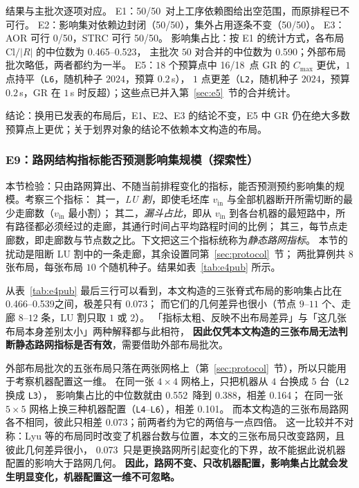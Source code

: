 \documentclass[manuscript,screen,review]{acmart}
\providecommand{\STRC}{\textsc{STRC}}
\newcommand{\NSeeds}{10}
\newcommand{\NPairs}{50}
\newcommand{\EoneFracMed}{0.590}    %
\newcommand{\NPubPairs}{50}
\newcommand{\PubPassMiss}{\NPubPairs/\NPubPairs}
\newcommand{\PubFeasRone}{0/\NPubPairs}
\newcommand{\PubFeasRtwo}{\NPubPairs/\NPubPairs}
\newcommand{\PubPassClosed}{\NPubPairs/\NPubPairs}
\newcommand{\PubPassInvar}{\NPubPairs/\NPubPairs}
\newcommand{\PubEoneFracLo}{0.465}
\newcommand{\PubEoneFracHi}{0.523}
\newcommand{\PubCloLo}{0.388}
\newcommand{\PubCloHi}{0.552}
\newcommand{\PubCloSpread}{0.164}
\newcommand{\PubCloSpreadBig}{0.101}
\newcommand{\SelfCloLo}{0.466}
\newcommand{\SelfCloHi}{0.539}
\newcommand{\SelfCloSpread}{0.073}
\newcommand{\PubEfiveNoCross}{16/18}
\begin{document}
结果与主批次逐项对应。
E1：\PubPassMiss\ 对上工序依赖图给出空范围，而原排程已不可行。
E2：影响集对依赖边封闭（\PubPassClosed），集外占用逐条不变（\PubPassInvar）。
E3：AOR 可行 \PubFeasRone，\STRC{} 可行 \PubFeasRtwo。
影响集占比：按 E1 的统计方式，各布局 \(\mathrm{Cl}/|R|\) 的中位数为 \PubEoneFracLo--\PubEoneFracHi，
主批次 \(\NPairs\) 对合并的中位数为 \EoneFracMed；外部布局批次略低，两者都约为一半。
E5：\(18\) 个预算点中 \PubEfiveNoCross\ 点 GR 的 \(C_{\max}\) 更优，\(1\) 点持平（\texttt{L6}，随机种子 \(2024\)，预算 \(0.2\)\,s），
\(1\) 点更差（\texttt{L2}，随机种子 \(2024\)，预算 \(0.2\)\,s，GR 在 \(1\)\,s 时反超）；这些点已并入第~\ref{sec:e5}~节的合并统计。

结论：换用已发表的布局后，E1、E2、E3 的结论不变，E5 中 GR 仍在绝大多数预算点上更优；关于划界对象的结论不依赖本文构造的布局。

\subsubsection{E9：路网结构指标能否预测影响集规模（探索性）}
\label{sec:e4}

本节检验：只由路网算出、不随当前排程变化的指标，能否预测预约影响集的规模。考察三个指标：
其一，\emph{LU 割}，即使毛坯库 \(v_{\mathrm{in}}\) 与全部机器断开所需切断的最少走廊数（\(v_{\mathrm{in}}\) 最小割）；
其二，\emph{漏斗占比}，即从 \(v_{\mathrm{in}}\) 到各台机器的最短路中，所有路径都必须经过的走廊，其通行时间占平均路程时间的比例；
其三，每节点走廊数，即走廊数与节点数之比。下文把这三个指标统称为\emph{静态路网指标}。
本节的扰动是阻断 LU 割中的一条走廊，其余设置同第~\ref{sec:protocol}~节；
两批算例共 \(8\) 张布局，每张布局 \(\NSeeds\) 个随机种子。结果如表~\ref{tab:e4pub} 所示。

从表~\ref{tab:e4pub} 最后三行可以看到，本文构造的三张脊式布局的影响集占比在 \SelfCloLo--\SelfCloHi 之间，极差只有 \SelfCloSpread；
而它们的几何差异也很小（节点 \(9\)--\(11\) 个、走廊 \(8\)--\(12\) 条，LU 割只取 \(1\) 或 \(2\)）。
「指标太粗、反映不出布局差异」与「这几张布局本身差别太小」两种解释都与此相符，
\textbf{因此仅凭本文构造的三张布局无法判断静态路网指标是否有效}，需要借助外部布局批次。

外部布局批次的五张布局只落在两张网格上（第~\ref{sec:protocol}~节），所以只能用于考察机器配置这一维。
在同一张 \(4\times 4\) 网格上，只把机器从 \(4\) 台换成 \(5\) 台（\texttt{L2} 换成 \texttt{L3}），
影响集占比的中位数就由 \PubCloHi\ 降到 \PubCloLo，相差 \PubCloSpread；
在同一张 \(5\times 5\) 网格上换三种机器配置（\texttt{L4}--\texttt{L6}），相差 \PubCloSpreadBig。
而本文构造的三张布局路网各不相同，彼此只相差 \SelfCloSpread；前两者约为它的两倍与一点四倍。
这一比较并不对称：Lyu 等的布局同时改变了机器台数与位置，本文的三张布局只改变路网，且彼此几何差异很小，
\SelfCloSpread\ 只是更换路网所引起变化的下界，故不能据此说机器配置的影响大于路网几何。
\textbf{因此，路网不变、只改机器配置，影响集占比就会发生明显变化，机器配置这一维不可忽略。}
\end{document}
